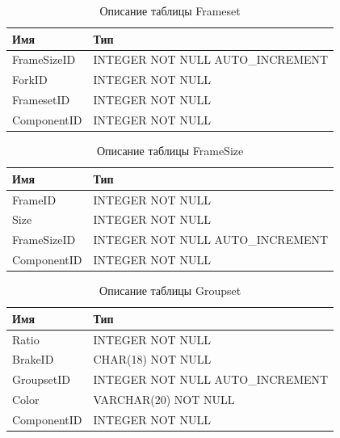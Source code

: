 
\begin{table}[h!] 
	\centering
	\caption{Описание таблицы Frameset}
	\begin{tabular}{|l|l|}
		\hline \textbf{Имя} & \textbf{Тип} \\
		\hline
		FrameSizeID &   INTEGER NOT NULL AUTO\_INCREMENT \\ \hline
		ForkID &        INTEGER NOT NULL \\ \hline
		FramesetID &    INTEGER NOT NULL \\ \hline
		ComponentID &   INTEGER NOT NULL \\ \hline
	\end{tabular}
	\label{tab:frameset}
\end{table}



\begin{table}[h!] 
	\centering
	\caption{Описание таблицы FrameSize}
	\begin{tabular}{|l|l|}
		\hline \textbf{Имя} & \textbf{Тип} \\
		\hline
		FrameID &       INTEGER NOT NULL \\ \hline
		Size &  INTEGER NOT NULL \\ \hline
		FrameSizeID &   INTEGER NOT NULL AUTO\_INCREMENT \\ \hline
		ComponentID &   INTEGER NOT NULL \\ \hline
	\end{tabular}
	\label{tab:framesize}
\end{table}



\begin{table}[h!] 
	\centering
	\caption{Описание таблицы Groupset}
	\begin{tabular}{|l|l|}
		\hline \textbf{Имя} & \textbf{Тип} \\
		\hline
		Ratio & INTEGER NOT NULL \\ \hline
		BrakeID &       CHAR(18) NOT NULL \\ \hline
		GroupsetID &    INTEGER NOT NULL AUTO\_INCREMENT \\ \hline
		Color & VARCHAR(20) NOT NULL \\ \hline
		ComponentID &   INTEGER NOT NULL \\ \hline
	\end{tabular}
	\label{tab:groupset}
\end{table}


